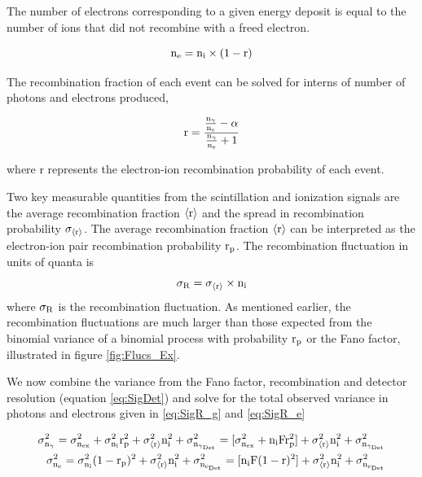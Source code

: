 \noindent The number of electrons corresponding to a given energy deposit is equal to the number of ions that did not recombine with a freed electron. 

\begin{equation}
\rm  n_e = n_i\times (1-r)\\
\label{eq:Electrons}
\end{equation}

\noindent The recombination fraction of each event can be solved for interns of number of photons and electrons produced,

\begin{equation}
\rm r= \frac{\frac{n_\gamma}{n_e}-\alpha}{\frac{n_\gamma}{n_e} + 1}
\label{eq:recomb_frac}
\end{equation}

\noindent where r represents the electron-ion recombination probability of each event. 

Two key measurable quantities from the scintillation and ionization signals are the average recombination fraction $\rm \left<r\right>$ and the spread in recombination probability $\rm \sigma_{\left<r\right>}$. The average recombination fraction $\rm \left<r\right>$ can be interpreted as the electron-ion pair recombination probability $\rm r_p$. The recombination fluctuation in units of quanta is 
\begin{equation}
\rm \sigma_R = \rm \sigma_{\left<r\right>} \times n_i
\label{eq:R_eq}
\end{equation}
\noindent where $\rm \sigma_R$ is the recombination fluctuation. As mentioned earlier, the recombination fluctuations are much larger than those expected from the binomial variance of a binomial process with probability $\rm r_p$ or the Fano factor, illustrated in figure \ref{fig:Flucs_Ex}.


 We now combine the variance from the Fano factor, recombination and detector resolution (equation \ref{eq:SigDet}) and solve for the total observed variance in photons and electrons given in \ref{eq:SigR_g} and \ref{eq:SigR_e}

\begin{alignat}{2}
\label{eq:SigR_g} \rm \sigma_{n_\gamma}^2  =\sigma_{n_{ex}}^2 + \sigma_{n_i}^2 r_p^2 +  \sigma_{\left<r\right>}^2 n_i^2 +\sigma_{n_{\gamma_{Det}}}^2 =  [\sigma_{n_{ex}}^2 + n_iF r_p^2] + \sigma_{\left<r\right>}^2 n_i^2 + \sigma_{n_{\gamma_{Det}}}^2 \\
\label{eq:SigR_e} \rm \sigma_{n_e}^2  = \sigma_{n_i}^2 (1-r_p)^2 +  \sigma_{\left<r\right>}^2 n_i^2 +\sigma_{n_{e_{Det}}}^2= [n_iF(1-r)^2]+ \sigma_{\left<r\right>}^2 n_i^2 +\sigma_{n_{e_{Det}}}^2
\end{alignat}

